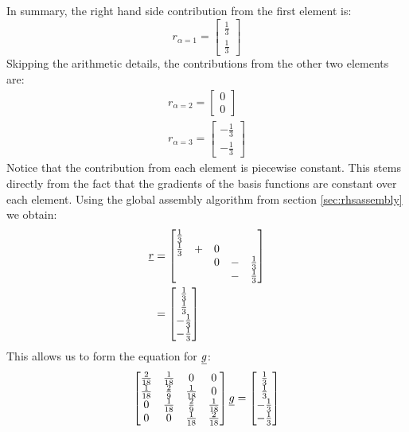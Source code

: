 \documentclass[a4paper, 11pt]{book}
\begin{document}
In summary, the right hand side contribution from the first element is:
\begin{equation}
  r_{\alpha=1}=
  \begin{bmatrix}
    \frac{1}{3}\\
    \frac{1}{3}
  \end{bmatrix}
\end{equation}
Skipping the arithmetic details, the contributions from the other two
elements are:
\begin{gather}
  r_{\alpha=2}=
  \begin{bmatrix}
    0\\
    0
  \end{bmatrix}\\
  r_{\alpha=3}=
  \begin{bmatrix}
    -\frac{1}{3}\\
    -\frac{1}{3}
  \end{bmatrix}
\end{gather}
Notice that the contribution from each element is piecewise constant. This
stems directly from the fact that the gradients of the basis functions are
constant over each element. Using the global assembly algorithm from section
\ref{sec:rhsassembly} we obtain:
\begin{equation}
  \begin{split}
  \underline{r}&=
  \begin{bmatrix}
    \frac{1}{3}\\
    \frac{1}{3}&+&0\\
    &\phantom{+}&0&-&\frac{1}{3}\\
    & &&-&\frac{1}{3}
  \end{bmatrix}\\
  &=
  \begin{bmatrix}
    \frac{1}{3}\\
    \frac{1}{3}\\
    -\frac{1}{3}\\
    -\frac{1}{3}
  \end{bmatrix}\\  
  \end{split}
\end{equation}
This allows us to form the equation for $\underline{g}$:
\begin{equation}
  \begin{bmatrix}
    \frac{2}{18} & \frac{1}{18} & 0 & 0\\
    \frac{1}{18} & \frac{2}{9} &  \frac{1}{18} & 0\\
    0& \frac{1}{18} & \frac{2}{9} &  \frac{1}{18} \\
    0& 0& \frac{1}{18} & \frac{2}{18}
  \end{bmatrix}
  \underline{g}
  =\begin{bmatrix}
    \frac{1}{3}\\
    \frac{1}{3}\\
    -\frac{1}{3}\\
    -\frac{1}{3}
  \end{bmatrix}
\end{equation}
\end{document}
